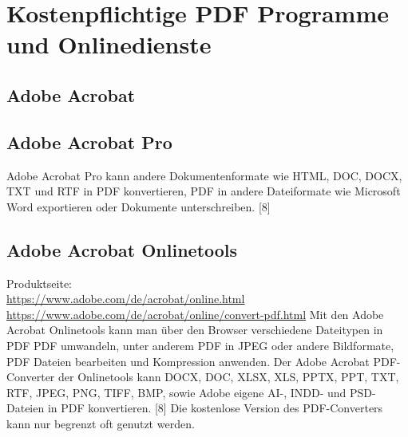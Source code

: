 \section{Kostenpflichtige PDF Programme und Onlinedienste}

\subsection{Adobe Acrobat}

\subsection{Adobe Acrobat Pro}
Adobe Acrobat Pro kann andere Dokumentenformate wie HTML, DOC, DOCX, TXT und RTF in PDF konvertieren, PDF in andere Dateiformate wie Microsoft Word exportieren oder Dokumente unterschreiben. [8]

\subsection{Adobe Acrobat Onlinetools}
Produktseite: \\
\url{https://www.adobe.com/de/acrobat/online.html} \\
\url{https://www.adobe.com/de/acrobat/online/convert-pdf.html}
Mit den Adobe Acrobat Onlinetools kann man über den Browser verschiedene Dateitypen in PDF PDF umwandeln, unter anderem PDF in JPEG oder andere Bildformate, PDF Dateien bearbeiten und Kompression anwenden.
Der Adobe Acrobat PDF-Converter der Onlinetools kann DOCX, DOC, XLSX, XLS, PPTX, PPT, TXT, RTF, JPEG, PNG, TIFF, BMP, sowie Adobe eigene AI-, INDD- und PSD-Dateien in PDF konvertieren. [8] Die kostenlose Version des PDF-Converters kann nur begrenzt oft genutzt werden.
